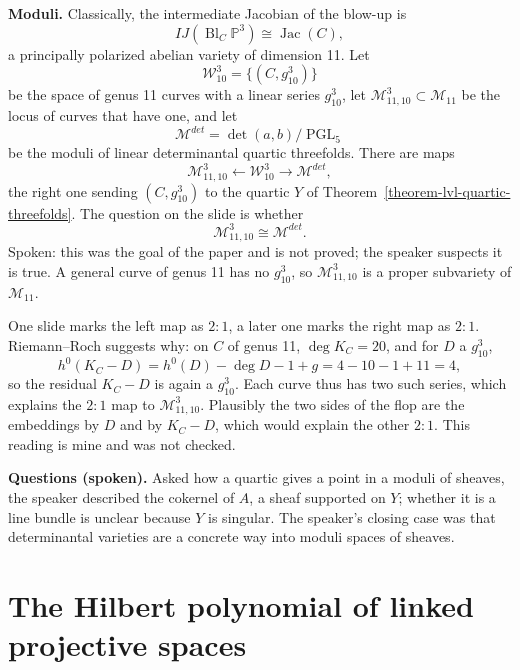 \medskip\noindent
{\bf Moduli.} Classically, the intermediate
Jacobian of the blow-up is
$$
IJ(\operatorname{Bl}_C\mathbb{P}^3)
\cong \operatorname{Jac}(C),
$$
a principally polarized abelian variety of
dimension 11. Let
$$
\mathcal{W}^3_{10} =
\{ (C, g^3_{10}) \}
$$
be the space of genus 11 curves with a
linear series $g^3_{10}$, let
$\mathcal{M}^3_{11,10} \subset
\mathcal{M}_{11}$ be the locus of curves
that have one, and let
$$
\mathcal{M}^{det} =
\operatorname{det}(a,b) /
\operatorname{PGL}_5
$$
be the moduli of linear determinantal
quartic threefolds. There are maps
$$
\mathcal{M}^3_{11,10}
\leftarrow \mathcal{W}^3_{10}
\rightarrow \mathcal{M}^{det},
$$
the right one sending $(C,g^3_{10})$ to the
quartic $Y$ of
Theorem~\ref{theorem-lvl-quartic-threefolds}.
The question on the slide is whether
$$
\mathcal{M}^3_{11,10} \cong
\mathcal{M}^{det}.
$$
Spoken: this was the goal of the paper and
is not proved; the speaker suspects it is
true. A general curve of genus 11 has no
$g^3_{10}$, so $\mathcal{M}^3_{11,10}$ is a
proper subvariety of $\mathcal{M}_{11}$.

\begin{remark}
\label{remark-lozano-residual-series}
One slide marks the left map as $2:1$, a
later one marks the right map as $2:1$.
Riemann--Roch suggests why: on $C$ of genus
11, $\deg K_C = 20$, and for $D$ a
$g^3_{10}$,
$$
h^0(K_C - D) = h^0(D) - \deg D - 1 + g
= 4 - 10 - 1 + 11 = 4,
$$
so the residual $K_C - D$ is again a
$g^3_{10}$. Each curve thus has two such
series, which explains the $2:1$ map to
$\mathcal{M}^3_{11,10}$. Plausibly the two
sides of the flop are the embeddings by $D$
and by $K_C - D$, which would explain the
other $2:1$. This reading is mine and was
not checked.
\end{remark}

\medskip\noindent
{\bf Questions (spoken).} Asked how a
quartic gives a point in a moduli of
sheaves, the speaker described the cokernel
of $A$, a sheaf supported on $Y$; whether it
is a line bundle is unclear because $Y$ is
singular. The speaker's closing case was
that determinantal varieties are a concrete
way into moduli spaces of sheaves.

\section{The Hilbert polynomial of linked
projective spaces}
\label{section-de-leon-linked-spaces}

